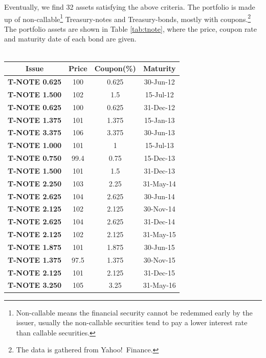 \documentclass[oneside,12pt]{report}
\begin{document}
{\noindent Eventually, we find 32 assets satisfying the above criteria. The portfolio is made up of non-callable\footnote{Non-callable means the financial security cannot be redemmed early by the issuer, usually the non-callable securities tend to pay a lower interest rate than callable securities.} Treasury-notes and Treasury-bonds, mostly with coupons.\footnote{\noindent The data is gathered from Yahoo!~Finance.} The portfolio assets are shown in Table \ref{tab:tnote}, where the price, coupon rate and maturity date of each bond are given. \\
\\
\newpage
\begin{table}[h]
\centering
    \begin{tabular}{|c|c|c|c|}
 \hline
    \textbf{Issue} & \textbf{Price} & \textbf{Coupon(\%)} & \textbf{Maturity} \\\hline
    \textbf{T-NOTE 0.625} & 100   & 0.625 & 30-Jun-12 \\\hline
    \textbf{T-NOTE 1.500} & 102   & 1.5   & 15-Jul-12 \\\hline
    \textbf{T-NOTE 0.625} & 100   & 0.625 & 31-Dec-12 \\\hline
    \textbf{T-NOTE 1.375} & 101   & 1.375 & 15-Jan-13 \\\hline
    \textbf{T-NOTE 3.375} & 106   & 3.375 & 30-Jun-13 \\\hline
    \textbf{T-NOTE 1.000} & 101   & 1     & 15-Jul-13 \\\hline
    \textbf{T-NOTE 0.750} & 99.4  & 0.75  & 15-Dec-13 \\\hline
    \textbf{T-NOTE 1.500} & 101   & 1.5   & 31-Dec-13 \\\hline
    \textbf{T-NOTE 2.250} & 103   & 2.25  & 31-May-14 \\\hline
    \textbf{T-NOTE 2.625} & 104   & 2.625 & 30-Jun-14 \\\hline
    \textbf{T-NOTE 2.125} & 102   & 2.125 & 30-Nov-14 \\\hline
    \textbf{T-NOTE 2.625} & 104   & 2.625 & 31-Dec-14 \\\hline
    \textbf{T-NOTE 2.125} & 102   & 2.125 & 31-May-15 \\\hline
    \textbf{T-NOTE 1.875} & 101   & 1.875 & 30-Jun-15 \\\hline
    \textbf{T-NOTE 1.375} & 97.5  & 1.375 & 30-Nov-15 \\\hline
    \textbf{T-NOTE 2.125} & 101   & 2.125 & 31-Dec-15 \\\hline
    \textbf{T-NOTE 3.250} & 105   & 3.25  & 31-May-16 \\\hline

\end{tabular}
\end{table}}
\end{document}
